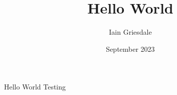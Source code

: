\documentclass{article}
\title{Hello World}
\author{Iain Griesdale}
\date{September 2023}
\begin{document}
Hello World Testing
\end{document}
